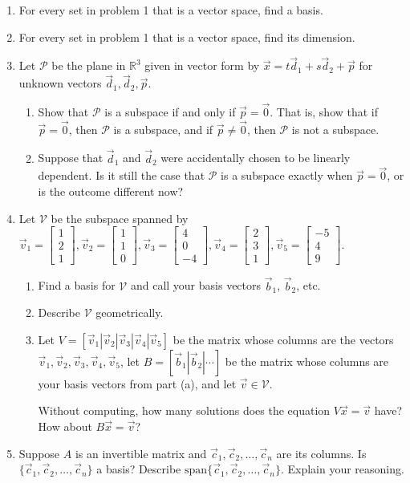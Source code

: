 \documentclass[letter]{article}
\newcommand{\R}{\mathbb{R}}
\newcommand{\Span}{\mathrm{span}}
\newcommand{\mat}[1]{\begin{bmatrix}#1\end{bmatrix}}
\begin{document}
\begin{enumerate}
		\item For every set in problem 1 that is a vector space, find a basis.
		\item For every set in problem 1 that is a vector space, find its dimension.

		\item Let $\mathcal P$ be the plane in $\R^3$ given in vector form by
			$\vec x=t\vec d_1+s\vec d_2+\vec p$ for unknown vectors $\vec d_1,\vec d_2,\vec p$.
			\begin{enumerate}
				\item Show that $\mathcal P$ is a subspace if and only if $\vec p=\vec 0$.  That is, show
				that if $\vec p=\vec 0$, then $\mathcal P$ is a subspace, and if $\vec p\neq \vec 0$,
				then $\mathcal P$ is not a subspace.
				\item Suppose that $\vec d_1$ and $\vec d_2$ were accidentally chosen
					to be linearly dependent.  Is it still the case that $\mathcal P$ is
					a subspace exactly when $\vec p=\vec 0$, or is the outcome different now?
			\end{enumerate}
		\item Let $\mathcal V$ be the subspace spanned by $\vec v_1=\mat{1\\2\\1},\vec v_2=\mat{1\\1\\0},\vec v_3=\mat{4\\0\\-4},
			\vec v_4=\mat{2\\3\\1},\vec v_5=\mat{-5\\4\\9}$.
			\begin{enumerate}
				\item Find a basis for $\mathcal V$ and call your basis vectors $\vec b_1$, $\vec b_2$, etc.
				\item Describe $\mathcal V$ geometrically.
				\item Let $V=[\vec v_1|\vec v_2|\vec v_3|\vec v_4|\vec v_5]$ be the matrix whose columns are the vectors
					$\vec v_1,\vec v_2,\vec v_3,\vec v_4,\vec v_5$, let $B=[\vec b_1|\vec b_2|\cdots]$ be the matrix
					whose columns are your basis vectors from part (a), and let $\vec v\in \mathcal V$.

					Without computing, how many solutions does the equation $V\vec x=\vec v$ have?  How
					about $B\vec x=\vec v$?
			\end{enumerate}
		\item Suppose $A$ is an invertible matrix and $\vec c_1,\vec c_2,\ldots,\vec c_n$ are its columns.  Is
			$\{\vec c_1,\vec c_2,\ldots, \vec c_n\}$ a basis?  Describe $\Span\{\vec c_1,\vec c_2,\ldots, \vec c_n\}$.  Explain
			your reasoning.

	\end{enumerate}
\end{document}
